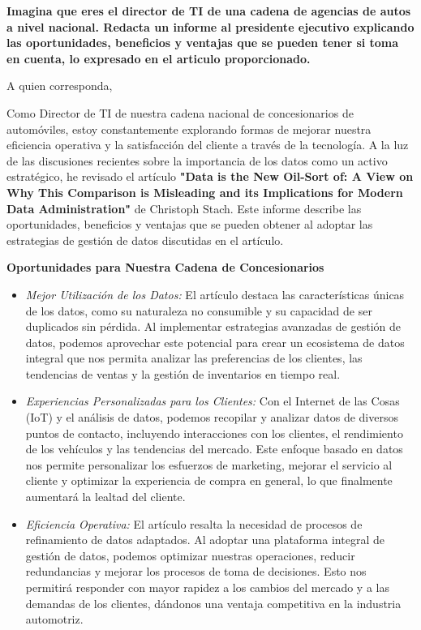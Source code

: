 \begin{center}
\textbf{Imagina que eres el director de TI de una cadena de agencias de autos a nivel nacional. Redacta un informe al presidente ejecutivo explicando las oportunidades, beneficios y ventajas que se pueden tener si toma en cuenta, lo expresado en el articulo proporcionado.}\\
\end{center}

A quien corresponda,

Como Director de TI de nuestra cadena nacional de concesionarios de automóviles, estoy constantemente explorando formas de mejorar nuestra eficiencia operativa y la satisfacción del cliente a través de la tecnología. A la luz de las discusiones recientes sobre la importancia de los datos como un activo estratégico, he revisado el artículo \textbf{"Data is the New Oil-Sort of: A View on Why This Comparison is Misleading and its Implications for Modern Data Administration"} de Christoph Stach. Este informe describe las oportunidades, beneficios y ventajas que se pueden obtener al adoptar las estrategias de gestión de datos discutidas en el artículo.

\textbf{Oportunidades para Nuestra Cadena de Concesionarios}
\begin{itemize}
    \item \textit{Mejor Utilización de los Datos: }
El artículo destaca las características únicas de los datos, como su naturaleza no consumible y su capacidad de ser duplicados sin pérdida. Al implementar estrategias avanzadas de gestión de datos, podemos aprovechar este potencial para crear un ecosistema de datos integral que nos permita analizar las preferencias de los clientes, las tendencias de ventas y la gestión de inventarios en tiempo real.
    \item \textit{Experiencias Personalizadas para los Clientes: }
Con el Internet de las Cosas (IoT) y el análisis de datos, podemos recopilar y analizar datos de diversos puntos de contacto, incluyendo interacciones con los clientes, el rendimiento de los vehículos y las tendencias del mercado. Este enfoque basado en datos nos permite personalizar los esfuerzos de marketing, mejorar el servicio al cliente y optimizar la experiencia de compra en general, lo que finalmente aumentará la lealtad del cliente.
    \item \textit{Eficiencia Operativa: }
    El artículo resalta la necesidad de procesos de refinamiento de datos adaptados. Al adoptar una plataforma integral de gestión de datos, podemos optimizar nuestras operaciones, reducir redundancias y mejorar los procesos de toma de decisiones. Esto nos permitirá responder con mayor rapidez a los cambios del mercado y a las demandas de los clientes, dándonos una ventaja competitiva en la industria automotriz.
\end{itemize}


